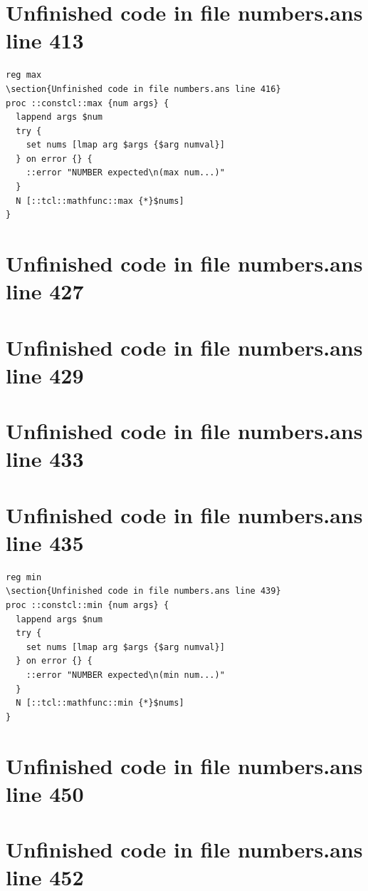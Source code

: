 \documentclass[twoside,9pt]{report}
\begin{document}
\section{Unfinished code in file numbers.ans line 413}
\begin{lstlisting}
reg max
\section{Unfinished code in file numbers.ans line 416}
proc ::constcl::max {num args} {
  lappend args $num
  try {
    set nums [lmap arg $args {$arg numval}]
  } on error {} {
    ::error "NUMBER expected\n(max num...)"
  }
  N [::tcl::mathfunc::max {*}$nums]
}
\end{lstlisting}
\section{Unfinished code in file numbers.ans line 427}
\section{Unfinished code in file numbers.ans line 429}
\section{Unfinished code in file numbers.ans line 433}
\section{Unfinished code in file numbers.ans line 435}
\begin{lstlisting}
reg min
\section{Unfinished code in file numbers.ans line 439}
proc ::constcl::min {num args} {
  lappend args $num
  try {
    set nums [lmap arg $args {$arg numval}]
  } on error {} {
    ::error "NUMBER expected\n(min num...)"
  }
  N [::tcl::mathfunc::min {*}$nums]
}
\end{lstlisting}
\section{Unfinished code in file numbers.ans line 450}
\section{Unfinished code in file numbers.ans line 452}
\end{document}
